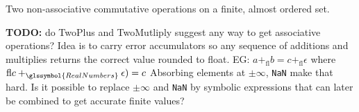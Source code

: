 Two non-associative commutative operations on a finite,
almost ordered set.

\textbf{TODO:} do TwoPlus and TwoMutliply 
suggest any way to get associative operations?
Idea is to carry error accumulators so 
any sequence of additions and multiplies 
returns the correct  value rounded to float.
EG: $ a +_{\text{fl}} b = c +_{\text{fl}} \epsilon$
where $\text{fl} c +_{\glssymbol{RealNumbers}} \epsilon) = c$
Absorbing elements at $\pm\infty$, \texttt{NaN} make that hard.
Is it possible to replace $\pm\infty$ and \texttt{NaN}
by symbolic expressions that can later be combined to get 
accurate finite values?



